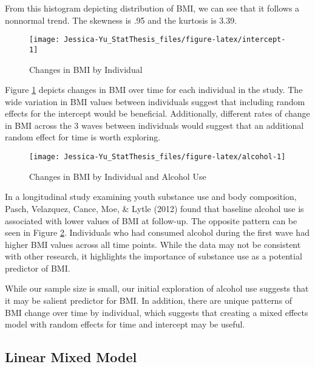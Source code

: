 \documentclass[12pt, twoside]{amherstthesis}
\begin{document}
From this histogram depicting distribution of BMI, we can see that it follows a nonnormal trend. The skewness is .95 and the kurtosis is 3.39.
\begin{figure}

{\centering \texttt{[image: Jessica-Yu\_StatThesis\_files/figure-latex/intercept-1]} 

}

\caption{Changes in BMI by Individual}\label{fig:intercept}
\end{figure}
Figure \ref{fig:intercept} depicts changes in BMI over time for each individual in the study. The wide variation in BMI values between individuals suggest that including random effects for the intercept would be beneficial. Additionally, different rates of change in BMI across the 3 waves between individuals would suggest that an additional random effect for time is worth exploring.
\begin{figure}

{\centering \texttt{[image: Jessica-Yu\_StatThesis\_files/figure-latex/alcohol-1]} 

}

\caption{Changes in BMI by Individual and Alcohol Use}\label{fig:alcohol}
\end{figure}
In a longitudinal study examining youth substance use and body composition, Pasch, Velazquez, Cance, Moe, \& Lytle (2012) found that baseline alcohol use is associated with lower values of BMI at follow-up. The opposite pattern can be seen in Figure \ref{fig:alcohol}. Individuals who had consumed alcohol during the first wave had higher BMI values across all time points. While the data may not be consistent with other research, it highlights the importance of substance use as a potential predictor of BMI.

While our sample size is small, our initial exploration of alcohol use suggests that it may be salient predictor for BMI. In addition, there are unique patterns of BMI change over time by individual, which suggests that creating a mixed effects model with random effects for time and intercept may be useful.

\hypertarget{linear-mixed-model}{%
\subsection{Linear Mixed Model}\label{linear-mixed-model}}
\end{document}

